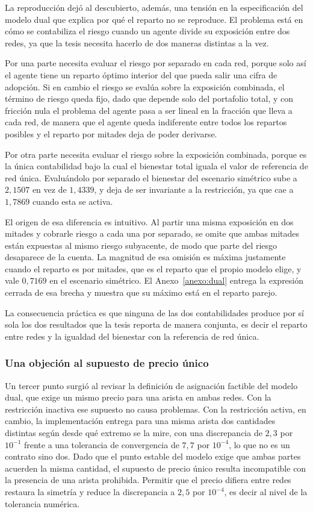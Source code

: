 La reproducción dejó al descubierto, además, una tensión en la especificación del
modelo dual que explica por qué el reparto no se reproduce. El problema está en
cómo se contabiliza el riesgo cuando un agente divide su exposición entre dos
redes, ya que la tesis necesita hacerlo de dos maneras distintas a la vez.

Por una parte necesita evaluar el riesgo por separado en cada red, porque solo
así el agente tiene un reparto óptimo interior del que pueda salir una cifra de
adopción. Si en cambio el riesgo se evalúa sobre la exposición combinada, el
término de riesgo queda fijo, dado que depende solo del portafolio total, y con
fricción nula el problema del agente pasa a ser lineal en la fracción que lleva a
cada red, de manera que el agente queda indiferente entre todos los repartos
posibles y el reparto por mitades deja de poder derivarse.

Por otra parte necesita evaluar el riesgo sobre la exposición combinada, porque
es la única contabilidad bajo la cual el bienestar total iguala el valor de
referencia de red única. Evaluándolo por separado el bienestar del escenario
simétrico sube a $2,1507$ en vez de $1,4339$, y deja de ser invariante a la
restricción, ya que cae a $1,7869$ cuando esta se activa.

El origen de esa diferencia es intuitivo. Al partir una misma exposición en dos
mitades y cobrarle riesgo a cada una por separado, se omite que ambas mitades
están expuestas al mismo riesgo subyacente, de modo que parte del riesgo
desaparece de la cuenta. La magnitud de esa omisión es máxima justamente cuando
el reparto es por mitades, que es el reparto que el propio modelo elige, y vale
$0,7169$ en el escenario simétrico. El Anexo~\ref{anexo:dual} entrega la
expresión cerrada de esa brecha y muestra que su máximo está en el reparto
parejo.

La consecuencia práctica es que ninguna de las dos contabilidades produce por sí
sola los dos resultados que la tesis reporta de manera conjunta, es decir el
reparto entre redes y la igualdad del bienestar con la referencia de red única.

\subsubsection{Una objeción al supuesto de precio único}
\label{c4:venegas-dual-precio}

Un tercer punto surgió al revisar la definición de asignación factible del modelo
dual, que exige un mismo precio para una arista en ambas redes. Con la
restricción inactiva ese supuesto no causa problemas. Con la restricción activa,
en cambio, la implementación entrega para una misma arista dos cantidades
distintas según desde qué extremo se la mire, con una discrepancia de $2,3$ por
$10^{-1}$ frente a una tolerancia de convergencia de $7,7$ por $10^{-4}$, lo que
no es un contrato sino dos. Dado que el punto estable del modelo exige que ambas
partes acuerden la misma cantidad, el supuesto de precio único resulta
incompatible con la presencia de una arista prohibida. Permitir que el precio
difiera entre redes restaura la simetría y reduce la discrepancia a $2,5$ por
$10^{-4}$, es decir al nivel de la tolerancia numérica.

